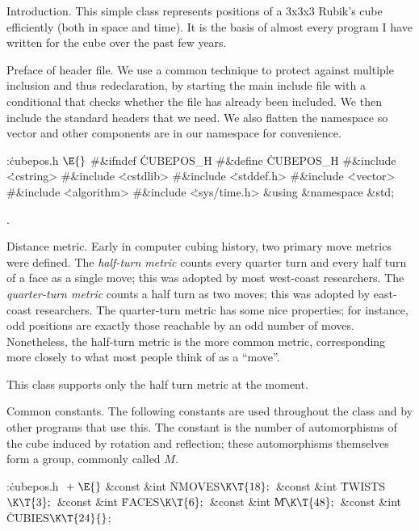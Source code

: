 
\def\mod{\mathop{mod}}


Introduction.
This simple class represents positions of a 3x3x3 Rubik's cube
efficiently (both in space and time).  It is the basis of almost every
program I have written for the cube over the past few years.

\fi

Preface of header file.
We use a common technique to protect against multiple inclusion and
thus redeclaration, by starting the main include file with a
conditional that checks whether the file has already been included.
We then include the standard headers that we need.  We also flatten
the namespace so vector and other components are in our namespace
for convenience.

\Y\B\4:\.{cubepos.h }\X${}\E{}$\6
\8\#\&{ifndef} \.{CUBEPOS\_H}\6
\8\#\&{define} \.{CUBEPOS\_H}\6
\8\#\&{include} \.{<cstring>}\6
\8\#\&{include} \.{<cstdlib>}\6
\8\#\&{include} \.{<stddef.h>}\6
\8\#\&{include} \.{<vector>}\6
\8\#\&{include} \.{<algorithm>}\6
\8\#\&{include} \.{<sys/time.h>}\6
\&{using} \&{namespace} \&{std};\par
{}.\fi

Distance metric.
Early in computer cubing history, two primary move metrics were
defined.  The {\it half-turn metric} counts every quarter turn and
every half turn of a face as a single move; this was adopted by most
west-coast researchers.  The {\it quarter-turn metric} counts a half
turn as two moves; this was adopted by east-coast researchers.  The
quarter-turn metric has some nice properties; for instance, odd
positions are exactly those reachable by an odd number of moves.
Nonetheless, the half-turn metric is the more common metric,
corresponding more closely to what most people think of as a ``move''.

This class supports only the half turn metric at the moment.

\fi

Common constants.
The following constants are used throughout the class and by other
programs that use this.  The  constant is the number of
automorphisms of the cube induced by rotation and reflection; these
automorphisms themselves form a group, commonly called $M$.

\Y\B\4:\.{cubepos.h }\X${}\mathrel+\E{}$\6
\&{const} \&{int} \.{NMOVES}${}\K\T{18};{}$\6
\&{const} \&{int} \.{TWISTS}${}\K\T{3};{}$\6
\&{const} \&{int} \.{FACES}${}\K\T{6};{}$\6
\&{const} \&{int} \|M${}\K\T{48};{}$\6
\&{const} \&{int} \.{CUBIES}${}\K\T{24}{}$;\par
\fi

